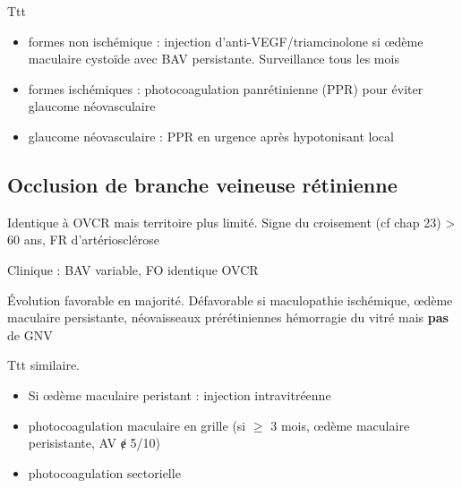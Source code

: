 \documentclass[11pt]{article}
\begin{document}
Ttt 
\begin{itemize}
\item formes non ischémique : injection d'anti-VEGF/triamcinolone si \oe{}dème
maculaire cystoïde avec BAV persistante. Surveillance tous les mois
\item formes ischémiques : photocoagulation panrétinienne (PPR) pour éviter glaucome
néovasculaire
\item glaucome néovasculaire : PPR en urgence après hypotonisant local \danger
\end{itemize}


\subsection{Occlusion de branche veineuse rétinienne}
\label{sec:org626a8e1}
Identique à OVCR mais territoire plus limité.
Signe du croisement (cf chap 23) \thus > 60 ans, FR d'artériosclérose

Clinique : BAV variable, FO identique OVCR

Évolution favorable en majorité. Défavorable si maculopathie ischémique,
\oe{}dème maculaire persistante, néovaisseaux prérétiniennes \thus hémorragie du
vitré mais \textbf{pas} de GNV

Ttt similaire. 
\begin{itemize}
\item Si \oe{}dème maculaire peristant : injection intravitréenne
\item photocoagulation maculaire en grille (si \(\ge\) 3 mois, \oe{}dème maculaire
perisistante, AV ɇ 5/10)
\item photocoagulation sectorielle
\end{itemize}
\end{document}
